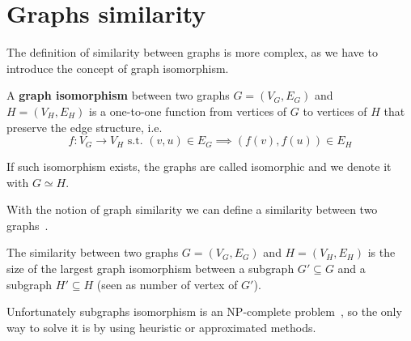 \section{Graphs similarity}

The definition of similarity between graphs is more complex, as we have to introduce the concept of graph isomorphism.

\begin{definizione}
	A \textbf{graph isomorphism} between two graphs $G=(V_{G}, E_{G})$ and $H=(V_{H}, E_{H})$ is a one-to-one function from vertices of $G$ to vertices of $H$ that preserve the edge structure, i.e.  
	\begin{equation}
	f : V_{G} \rightarrow V_{H} \text{ s.t. } (v, u) \in E_{G} \implies (f(v), f(u)) \in E_{H}
	\end{equation}
\end{definizione}

If such isomorphism exists, the graphs are called isomorphic and we denote it with $G \simeq H$.\medskip

With the notion of graph similarity we can define a similarity between two graphs~\cite{Bunke:1998:GDM:289720.289729}.\medskip

\begin{definizione}
	The similarity between two graphs $G=(V_{G}, E_{G})$ and $H=(V_{H}, E_{H})$ is the size of the largest graph isomorphism between a subgraph $G' \subseteq G$ and a subgraph $H' \subseteq H$ (seen as number of vertex of $G'$).
\end{definizione}

Unfortunately subgraphs isomorphism is an NP-complete problem~\cite{GareyJohnson:1979}, so the only way to solve it is by using heuristic or approximated methods.

